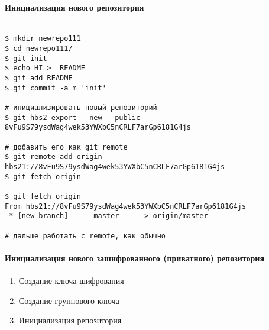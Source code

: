 \documentclass[11pt,a4paper]{article}
\begin{document}
\paragraph{Инициализация нового репозитория}

\begin{verbatim}

$ mkdir newrepo111
$ cd newrepo111/
$ git init
$ echo HI >  README
$ git add README
$ git commit -a m 'init'

# инициализировать новый репозиторий
$ git hbs2 export --new --public 8vFu9S79ysdWag4wek53YWXbC5nCRLF7arGp6181G4js

# добавить его как git remote
$ git remote add origin hbs21://8vFu9S79ysdWag4wek53YWXbC5nCRLF7arGp6181G4js
$ git fetch origin

$ git fetch origin
From hbs21://8vFu9S79ysdWag4wek53YWXbC5nCRLF7arGp6181G4js
 * [new branch]      master     -> origin/master

# дальше работать с remote, как обычно

\end{verbatim}

\paragraph{Инициализация нового зашифрованного (приватного) репозитория}

\begin{enumerate}
  \item Создание ключа шифрования
  \item Создание группового ключа
  \item Инициализация репозитория
\end{enumerate}
\end{document}
